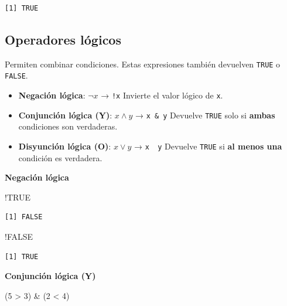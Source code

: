 \documentclass[
  letterpaper,
  DIV=11,
  numbers=noendperiod,
  twoside]{scrreprt}
\newenvironment{Shaded}{\begin{snugshade}}{\end{snugshade}}
\newcommand{\ConstantTok}[1]{\textcolor[rgb]{0.56,0.35,0.01}{#1}}
\newcommand{\DecValTok}[1]{\textcolor[rgb]{0.68,0.00,0.00}{#1}}
\newcommand{\NormalTok}[1]{\textcolor[rgb]{0.00,0.23,0.31}{#1}}
\newcommand{\SpecialCharTok}[1]{\textcolor[rgb]{0.37,0.37,0.37}{#1}}
\begin{document}
\begin{verbatim}
[1] TRUE
\end{verbatim}

\subsection{Operadores lógicos}\label{operadores-luxf3gicos}

Permiten combinar condiciones. Estas expresiones también devuelven
\texttt{TRUE} o \texttt{FALSE}.

\begin{itemize}
\item
  \textbf{Negación lógica}: \(\lnot x\) → \texttt{!x} Invierte el valor
  lógico de \texttt{x}.
\item
  \textbf{Conjunción lógica (Y)}: \(x \land y\) → \texttt{x\ \&\ y}
  Devuelve \texttt{TRUE} solo si \textbf{ambas} condiciones son
  verdaderas.
\item
  \textbf{Disyunción lógica (O)}: \(x \lor y\) →
  \texttt{x\ \textbar{}\ y} Devuelve \texttt{TRUE} si \textbf{al menos
  una} condición es verdadera.
\end{itemize}

\textbf{Negación lógica}

\begin{Shaded}
\begin{Highlighting}[]
\SpecialCharTok{!}\ConstantTok{TRUE}    
\end{Highlighting}
\end{Shaded}

\begin{verbatim}
[1] FALSE
\end{verbatim}

\begin{Shaded}
\begin{Highlighting}[]
\SpecialCharTok{!}\ConstantTok{FALSE}    
\end{Highlighting}
\end{Shaded}

\begin{verbatim}
[1] TRUE
\end{verbatim}

\textbf{Conjunción lógica (Y)}

\begin{Shaded}
\begin{Highlighting}[]
\NormalTok{  (}\DecValTok{5} \SpecialCharTok{\textgreater{}} \DecValTok{3}\NormalTok{) }\SpecialCharTok{\&}\NormalTok{ (}\DecValTok{2} \SpecialCharTok{\textless{}} \DecValTok{4}\NormalTok{)   }
\end{Highlighting}
\end{Shaded}
\end{document}
